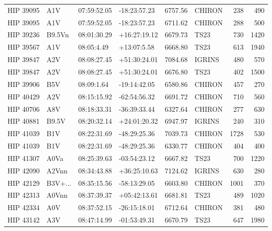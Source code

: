 \documentclass{emulateapj}
\begin{document}
\begin{longtable*}{|l|lllrlrr|}
   HIP 39095 &            A1V &    07:59:52.05 &   -18:23:57.23 &  6757.56 &     CHIRON &      238 &     490 \\
   HIP 39095 &            A1V &    07:59:52.05 &   -18:23:57.23 &  6711.62 &     CHIRON &      288 &     500 \\
   HIP 39236 &         B9.5Vn &    08:01:30.29 &   +16:27:19.12 &  6679.73 &       TS23 &      730 &    1420 \\
   HIP 39567 &            A1V &     08:05:4.49 &    +13:07:5.58 &  6668.80 &       TS23 &      613 &    1940 \\
   HIP 39847 &            A2V &    08:08:27.45 &   +51:30:24.01 &  7084.68 &     IGRINS &      480 &     570 \\
   HIP 39847 &            A2V &    08:08:27.45 &   +51:30:24.01 &  6676.80 &       TS23 &      402 &    1500 \\
   HIP 39906 &            B5V &     08:09:1.64 &   -19:14:42.05 &  6580.86 &     CHIRON &      457 &     270 \\
   HIP 40429 &            A2V &    08:15:15.92 &   -62:54:56.32 &  6691.72 &     CHIRON &      710 &     560 \\
   HIP 40706 &            A8V &    08:18:33.31 &   -36:39:33.44 &  6327.64 &     CHIRON &      277 &     630 \\
   HIP 40881 &          B9.5V &    08:20:32.14 &   +24:01:20.32 &  6947.97 &     IGRINS &      240 &     310 \\
   HIP 41039 &            B1V &    08:22:31.69 &   -48:29:25.36 &  7039.73 &     CHIRON &     1728 &     530 \\
   HIP 41039 &            B1V &    08:22:31.69 &   -48:29:25.36 &  6330.77 &     CHIRON &      404 &     400 \\
   HIP 41307 &           A0Va &    08:25:39.63 &   -03:54:23.12 &  6667.82 &       TS23 &      700 &    1220 \\
   HIP 42090 &          A2Vnn &    08:34:43.88 &   +36:25:10.63 &  7124.62 &     IGRINS &      630 &     280 \\
   HIP 42129 &        B3V+... &    08:35:15.56 &   -58:13:29.05 &  6603.80 &     CHIRON &     1001 &     370 \\
   HIP 42313 &          A0Vnn &    08:37:39.37 &   +05:42:13.61 &  6681.81 &       TS23 &      489 &    1020 \\
   HIP 42334 &            A0V &    08:37:52.15 &   -26:15:18.01 &  6712.64 &     CHIRON &      381 &     480 \\
   HIP 43142 &            A3V &    08:47:14.99 &   -01:53:49.31 &  6670.79 &       TS23 &      647 &    1980 \\

\end{longtable*}
\end{document}

